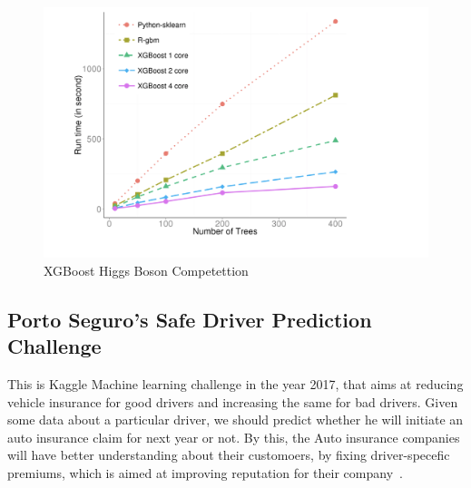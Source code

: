 \begin{figure}[!ht]
  \centering\includegraphics[width=\columnwidth]{images/Runtime-vs-Number-of-trees.png}
  \caption{XGBoost Higgs Boson Competettion~\cite{hid-sp18-401-XGBoost-runtime-comparision-image}}
\label{f:XGBoost-runtime-comparision}
\end{figure}

\subsection{Porto Seguro's Safe Driver Prediction Challenge} 

This is Kaggle Machine learning challenge in the year 2017, that aims at
reducing vehicle insurance for good drivers and increasing the same for bad
drivers. Given some data about a particular driver, we should predict whether
he will initiate an auto insurance claim for next year or not. By this, the
Auto insurance companies  will have better understanding about their
customoers, by fixing driver-specefic premiums, which is aimed at improving
reputation for their company~\cite{hid-sp18-401-Kaggle-Porto-Seguro}.

